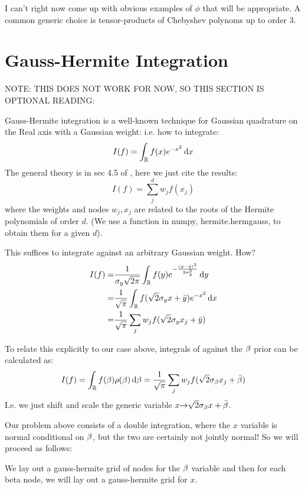 \documentclass{article}
\begin{document}
I can't right now come up with obvious examples of $\phi$ that will be
appropriate. A common generic choice is tensor-products of Chebyshev polynoms
up to order 3. 


\clearpage
\section{Gauss-Hermite Integration}
\label{sec:gauss_hermite_integration}
NOTE: THIS DOES NOT WORK FOR NOW, SO THIS SECTION IS OPTIONAL READING:

Gauss-Hermite integration is a well-known technique for Gaussian
quadrature on the Real axis with a Gaussian weight: i.e. how to integrate:
\begin{equation}
I(f) = \int_{ \mathbb{R} } f(x) e^{-x^2} \, \mathrm{d} x
\label{eq:standard_hermite_integral}
\end{equation} 
The general theory is in sec 4.5 of \cite{Press1992}, here we just cite the
results:
\begin{equation}
I(f) =  \sum_j^d w_j f(x_j)
\end{equation}
where the weights and nodes $w_j, x_j$ are related to the roots of the Hermite
polynomials of order $d$. (We use a function in numpy, hermite.hermgauss, to
obtain them for a given $d$).

This suffices to integrate against an arbitrary Gaussian weight. How?
\begin{align*}
I(f) =&
\frac{1}{{\sigma }_y \sqrt{2 \pi}} \int_{ \mathbb{R} } f(y) e^{-\frac{(y-\bar{y})^2}{2{\sigma }_y^2} }
\, \mathrm{d} y 
\\ 
=&
 \frac{1}{\sqrt{\pi}} \int_{ \mathbb{R} } f( \sqrt 2 \sigma_y x + \bar y)e^{-x^2}
\, \mathrm{d} x
\\ 
=& \frac {1}{\sqrt{\pi}} \sum_j w_j f(\sqrt 2 \sigma_y x_j + \bar y )
\end{align*}

To relate this explicitly to our case above, integrals of against the ${\beta}$ prior
can be calculated as:
$$
I(f) = \int_{ \mathbb{R} } f({\beta}) \rho({\beta}) \, \mathrm{d} {\beta} = \frac {1}{\sqrt{\pi}} \sum_j w_j
f(\sqrt 2 \sigma_{\beta} x_j + \bar {{\beta}} ) $$
I.e. we just shift and scale the generic variable $x {\rightarrow} \sqrt 2 \sigma_{\beta} x +
\bar {{\beta}}$.

Our problem above consists of a double integration, where the $x$ variable is
normal conditional on ${\beta}$, but the two are certainly not jointly  normal! So we
will proceed as follows:

We lay out a gauss-hermite grid of nodes for the ${\beta}$ variable and then for each
beta node, we will lay out a gauss-hermite grid for $x$. 
\end{document}
